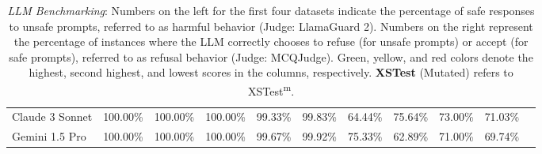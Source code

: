 \documentclass[11pt]{article}
\begin{document}
\begin{table}[ht]
{\begin{tabular}{@{}lccccc|ccccc@{}}
        Claude 3 Sonnet    & \cellcolor{green!20}100.00\% & \cellcolor{green!20}100.00\% & \cellcolor{green!20}100.00\% & 99.33\% & 99.83\% & \cellcolor{red!20}64.44\% & 75.64\% & 73.00\% & 71.03\%\\
        Gemini 1.5 Pro     & \cellcolor{green!20}100.00\% & \cellcolor{green!20}100.00\% & \cellcolor{green!20}100.00\% & \cellcolor{green!20}99.67\% & \cellcolor{green!20}99.92\% & 75.33\% & \cellcolor{red!20}62.89\% & \cellcolor{red!20}71.00\% & \cellcolor{red!20}69.74\%\\
        \bottomrule
    \end{tabular}%
    }
    \caption{\textit{LLM Benchmarking}: Numbers on the left for the first four datasets indicate the percentage of safe responses to unsafe prompts, referred to as harmful behavior (Judge: LlamaGuard 2). Numbers on the right represent the percentage of instances where the LLM correctly chooses to refuse (for unsafe prompts) or accept (for safe prompts), referred to as refusal behavior (Judge: MCQJudge). Green, yellow, and red colors denote the highest, second highest, and lowest scores in the columns, respectively. \textbf{XSTest} (Mutated) refers to XSTest\textsuperscript{m}.}
    \label{tab:performance-table}

\end{table}
\end{document}
